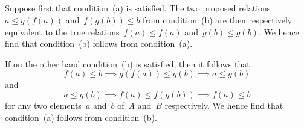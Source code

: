 \subsection{}

Suppose first that condition~(a) is satisfied.
The two proposed relations~$a ≤ g(f(a))$ and~$f(g(b)) ≤ b$ from condition~(b) are then respectively equivalent to the true relations~$f(a) ≤ f(a)$ and~$g(b) ≤ g(b)$.
We hence find that condition~(b) follows from condition~(a).

If on the other hand condition~(b) is satisfied, then it follows that
\[
	f(a) ≤ b
	\implies
	g(f(a)) ≤ g(b)
	\implies
	a ≤ g(b)
\]
and
\[
	a ≤ g(b)
	\implies
	f(a) ≤ f(g(b))
	\implies
	f(a) ≤ b
\]
for any two elements~$a$ and~$b$ of~$A$ and~$B$ respectively.
We hence find that condition~(a) follows from condition~(b).
